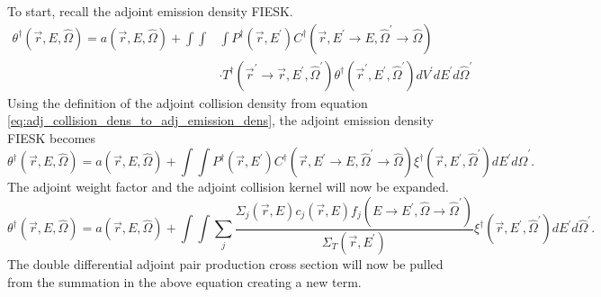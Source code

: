 To start, recall the adjoint emission density FIESK.
\begin{equation*}
  \begin{split}
    \theta^{\dagger}(\vec{r},E,\hat{\Omega}) = a(\vec{r},E,\hat{\Omega}) + 
    \int\int&\int P^{\dagger}(\vec{r},E^{'})
    C^{\dagger}(\vec{r},E^{'} \to E,\hat{\Omega}^{'} \to \hat{\Omega}) \\
    & \cdot T^{\dagger}(\vec{r}^{'} \to \vec{r},E^{'},\hat{\Omega}^{'})
    \theta^{\dagger}(\vec{r}^{'},E^{'},\hat{\Omega}^{'})
    dV^{'} dE^{'} d\hat{\Omega}^{'}
  \end{split}
\end{equation*}
Using the definition of the adjoint collision density from equation 
\ref{eq:adj_collision_dens_to_adj_emission_dens}, the adjoint emission density
FIESK becomes
\begin{equation*}
    \theta^{\dagger}(\vec{r},E,\hat{\Omega}) = a(\vec{r},E,\hat{\Omega}) + 
    \int\int P^{\dagger}(\vec{r},E^{'})
    C^{\dagger}(\vec{r},E^{'} \to E,\hat{\Omega}^{'} \to \hat{\Omega})
    \xi^{\dagger}(\vec{r},E^{'},\hat{\Omega}^{'}) dE^{'} d\hat{\Omega}^{'}.
\end{equation*}
The adjoint weight factor and the adjoint collision kernel will now be expanded.
\begin{equation*}
    \theta^{\dagger}(\vec{r},E,\hat{\Omega}) = a(\vec{r},E,\hat{\Omega}) + 
    \int\int \sum_j \frac{\Sigma_j(\vec{r},E)c_j(\vec{r},E)
      f_j(E \to E^{'},\hat{\Omega} \to \hat{\Omega}^{'})}{\Sigma_T(\vec{r},E^{'})}
    \xi^{\dagger}(\vec{r},E^{'},\hat{\Omega}^{'}) dE^{'} d\hat{\Omega}^{'}.
\end{equation*}
The double differential adjoint pair production cross section will now be
pulled from the summation in the above equation creating a new term.
